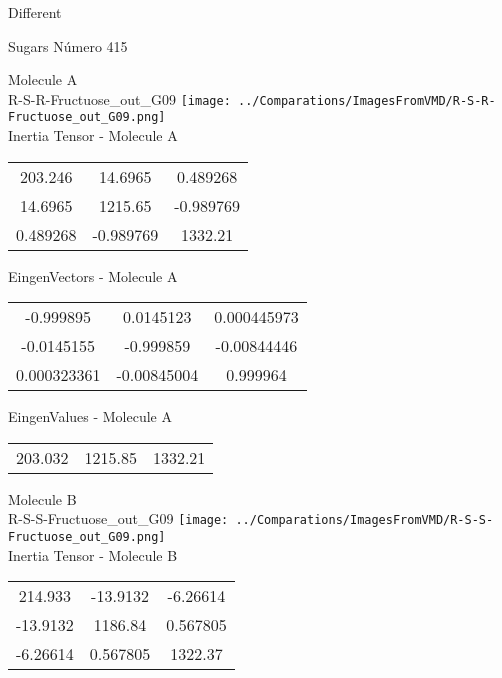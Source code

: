 \begin{center}
\vtab
\vtab
\textcolor{NavyBlue}{\Large Different}
\end{center}

 \newpage

\vtab[-2cm]
\begin{center}
{\large Sugars \tab Número 415}
\end{center}
\begin{multicols}{2}
\begin{center}

Molecule A \\ 
R-S-R-Fructuose\_out\_G09
\texttt{[image: ../Comparations/ImagesFromVMD/R-S-R-Fructuose\_out\_G09.png]}
\\
Inertia Tensor - Molecule A \\
\vtab

\begin{tabular}{|c c c|}
203.246	 & 	14.6965	 & 	0.489268	 \\
14.6965	 & 	1215.65	 & 	-0.989769	 \\
0.489268	 & 	-0.989769	 & 	1332.21
\end{tabular}

\vtab
 EingenVectors - Molecule A     \\
\vtab
\begin{tabular}{|c c c|}
-0.999895	 & 	0.0145123	 & 	0.000445973	 \\
-0.0145155	 & 	-0.999859	 & 	-0.00844446	 \\
0.000323361	 & 	-0.00845004	 & 	0.999964
\end{tabular}

\vtab
 EingenValues - Molecule A     \\
\vtab
\begin{tabular}{|c c c|}
203.032	 & 	1215.85	 & 	1332.21	 \\
\end{tabular}
\columnbreak

Molecule B \\ 
R-S-S-Fructuose\_out\_G09
\texttt{[image: ../Comparations/ImagesFromVMD/R-S-S-Fructuose\_out\_G09.png]}
\\
Inertia Tensor - Molecule B \\
\vtab

\begin{tabular}{|c c c|}
214.933	 & 	-13.9132	 & 	-6.26614	 \\
-13.9132	 & 	1186.84	 & 	0.567805	 \\
-6.26614	 & 	0.567805	 & 	1322.37
\end{tabular}


\end{center}
\end{multicols}
